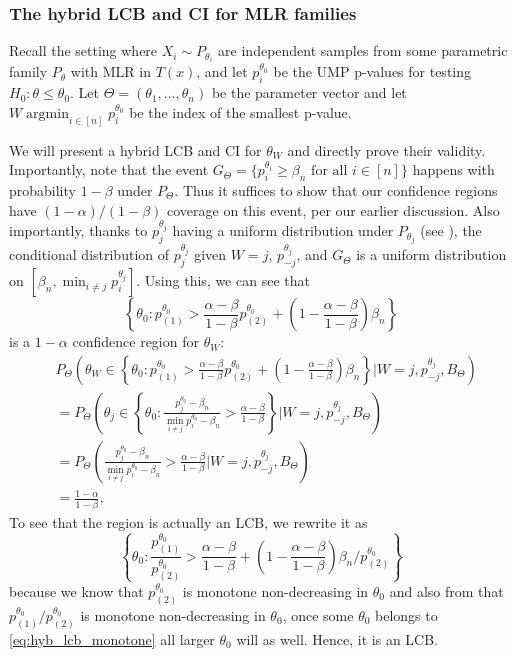 \documentclass{article}
\DeclareMathOperator*{\argmin}{argmin}
\begin{document}
\begin{appendix}
\subsubsection{The hybrid LCB and CI for MLR families}

Recall the setting where $X_i \sim P_{\theta_i}$ are independent samples from some parametric family $P_{\theta}$ with MLR in $T(x)$, and let $p^{\theta_0}_i$ be the UMP p-values for testing $H_0 : \theta \leq \theta_0$. Let $\Theta = (\theta_1, \dots, \theta_n)$ be the parameter vector and let $W \argmin_{i \in [n]} p^{\theta_0}_i$ be the index of the smallest p-value. 

We will present a hybrid LCB and CI for $\theta_W$ and directly prove their validity. Importantly, note that the event $G_{\Theta} = \{p^{\theta_i}_i \geq \beta_n \text{ for all } i \in [n]\}$ happens with probability $1-\beta$ under $P_{\Theta}$. Thus it suffices to show that our confidence regions have $(1-\alpha)/(1-\beta)$ coverage on this event, per our earlier discussion. Also importantly, thanks to $p^{\theta_j}_j$ having a uniform distribution under $P_{\theta_j}$ (see ), the conditional distribution of $p^{\theta_j}_j$ given $W=j$, $p^{\theta_j}_{-j}$, and $G_{\Theta}$ is a uniform distribution on $[\beta_n, \min_{i \neq j} p^{\theta_j}_i]$. Using this, we can see that 
\begin{equation*}
    \left\{\theta_0 : p^{\theta_0}_{(1)} > \frac{\alpha-\beta}{1-\beta}p^{\theta_0}_{(2)}  + \left(1 - \frac{\alpha - \beta}{1 - \beta}\right)\beta_n  \right\}
\end{equation*}
is a $1-\alpha$ confidence region for $\theta_W$:
\begin{align*}
    &P_{\Theta}\left( \theta_W \in \left\{\theta_0 : p^{\theta_0}_{(1)} > \frac{\alpha-\beta}{1-\beta}p^{\theta_0}_{(2)}  + \left(1 - \frac{\alpha - \beta}{1 - \beta}\right)\beta_n  \right\} | W= j, p^{\theta_j}_{-j}, B_{\Theta} \right) \\
    &= P_{\Theta}\left( \theta_j \in \left\{\theta_0 : \frac{p^{\theta_0}_j - \beta_n}{\min_{i \neq j}p^{\theta_0}_i  - \beta_n} > \frac{\alpha-\beta}{1-\beta}  \right\} | W= j, p^{\theta_j}_{-j}, B_{\Theta} \right) \\
    &= P_{\Theta}\left( \frac{p^{\theta_0}_j - \beta_n}{\min_{i \neq j}p^{\theta_0}_i  - \beta_n} > \frac{\alpha - \beta}{1-\beta} | W= j, p^{\theta_j}_{-j}, B_{\Theta} \right) \\
    &= \frac{1-\alpha}{1-\beta},
\end{align*} 
To see that the region is actually an LCB, we rewrite it as 
\begin{equation}
    \label{eq:hyb_lcb_monotone}
    \left\{\theta_0 : \frac{p^{\theta_0}_{(1)}}{p^{\theta_0}_{(2)}} > \frac{\alpha-\beta}{1-\beta}  + \left(1 - \frac{\alpha - \beta}{1 - \beta}\right)\beta_n \bigg/p^{\theta_0}_{(2)}  \right\}
\end{equation}
because we know that $p^{\theta_0}_{(2)}$ is monotone non-decreasing in $\theta_0$ and also from  that $p^{\theta_0}_{(1)}/p^{\theta_0}_{(2)}$ is monotone non-decreasing in $\theta_0$, once some $\theta_0$ belongs to \eqref{eq:hyb_lcb_monotone} all larger $\theta_0$ will as well. Hence, it is an LCB.  


\end{appendix}
\end{document}
